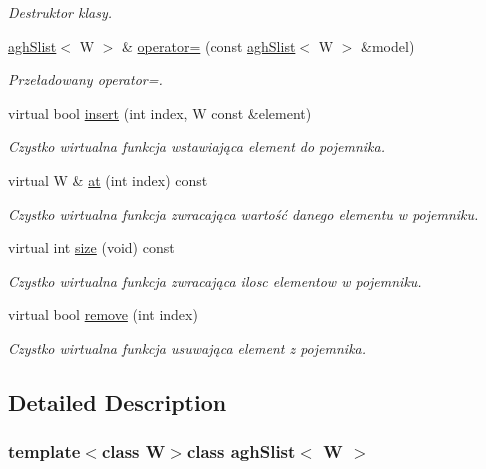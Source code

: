 \begin{DoxyCompactItemize}
\begin{DoxyCompactList}\small\item\em \-Destruktor klasy. \end{DoxyCompactList}\item 
\hyperlink{classaghSlist}{agh\-Slist}$<$ \-W $>$ \& \hyperlink{classaghSlist_aff364ad7b99ee7560d4d19efb32d2a51}{operator=} (const \hyperlink{classaghSlist}{agh\-Slist}$<$ \-W $>$ \&model)
\begin{DoxyCompactList}\small\item\em \-Przeładowany operator=. \end{DoxyCompactList}\item 
virtual bool \hyperlink{classaghSlist_adfb39cd96d6878189abd0d829575a79c}{insert} (int index, \-W const \&element)
\begin{DoxyCompactList}\small\item\em \-Czystko wirtualna funkcja wstawiająca element do pojemnika. \end{DoxyCompactList}\item 
virtual \-W \& \hyperlink{classaghSlist_a1bae09beb186b077469d650b9743d61c}{at} (int index) const 
\begin{DoxyCompactList}\small\item\em \-Czystko wirtualna funkcja zwracająca wartość danego elementu w pojemniku. \end{DoxyCompactList}\item 
virtual int \hyperlink{classaghSlist_a6b4744ddab368a8a2ef145cfd156c648}{size} (void) const 
\begin{DoxyCompactList}\small\item\em \-Czystko wirtualna funkcja zwracająca ilosc elementow w pojemniku. \end{DoxyCompactList}\item 
virtual bool \hyperlink{classaghSlist_a3e76d3bb89336f0385480699c3f8e51d}{remove} (int index)
\begin{DoxyCompactList}\small\item\em \-Czystko wirtualna funkcja usuwająca element z pojemnika. \end{DoxyCompactList}\end{DoxyCompactItemize}


\subsection{\-Detailed \-Description}
\subsubsection*{template$<$class \-W$>$class agh\-Slist$<$ W $>$}

